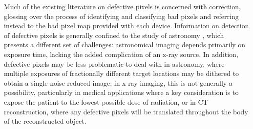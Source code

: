 \documentclass[../../IO-Pixels.tex]{subfiles}
\begin{document}
Much of the existing literature on defective pixels is concerned with correction, glossing over the process of identifying and classifying bad pixels and referring instead to the bad pixel map provided with each device.  Information on detection of defective pixels is generally confined to the study of astronomy , which presents a different set of challenges: astronomical imaging depends primarily on exposure time, lacking the added complication of an x-ray source. In addition, defective pixels may be less problematic to deal with in astronomy, where multiple exposures of fractionally different target locations may be dithered to obtain a single noise-reduced image; in x-ray imaging, this is not generally a possibility, particularly in medical applications where a key consideration is to expose the patient to the lowest possible dose of radiation, or in CT reconstruction, where any defective pixels will be translated throughout the body of the reconstructed object.
\end{document}
